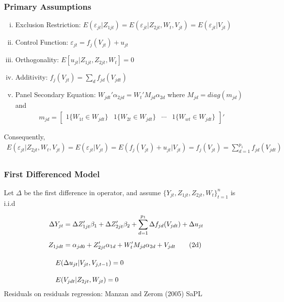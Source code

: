 \documentclass[9pt]{beamer}
\begin{document}
\begin{frame} 
\frametitle{Primary Assumptions} 

	\begin{enumerate}[i.)] \addtolength{\itemsep}{\baselineskip}
	    \item Exclusion Restriction: $E( \varepsilon_{jt}|Z_{1jt}  ) = E( \varepsilon_{jt} | Z_{2jt},W_{t},V_{jt}) = E(\varepsilon_{jt} | V_{jt})$
	    \item Control Function: $\varepsilon_{jt} = f_j(V_{jt}) + u_{jt} $	    \item Orthogonality: $E[u_{jt} |Z_{1jt},Z_{2jt},W_t] = 0$ 
	    \item Additivity: $ f_j(V_{jt}) = \sum_{d} f_{jd}(V_{jdt})$ 
	    \item Panel Secondary Equation: $W_{jdt}'\alpha_{2jd} = W_t'M_{jd}\alpha_{2d}$ where $M_{jd}=diag(m_{jd})$ and
	    \begin{align*} 
	    m_{jd} = \begin{bmatrix} 1\{W_{1t} \in W_{jdt}\} & 1\{W_{2t} \in W_{jdt}\} & \cdots & 1\{W_{wt} \in W_{jdt}\}  \end{bmatrix}'
	    \end{align*}

	\end{enumerate}
\vspace{0.25cm}	
 Consequently,
	\begin{align*} 
	E( \varepsilon_{jt} | Z_{2jt},W_{t},V_{jt}) = E(\varepsilon_{jt} | V_{jt}) =  E(f_j(V_{jt}) + u_{jt} | V_{jt}) = f_j(V_{jt}) = \sum_{d=1}^{p_1} f_{jd}(V_{jdt}) \\
	\end{align*}

\end{frame}
\begin{frame} 
\frametitle{First Differenced Model} 

Let $\Delta$ be the first difference in operator, and assume $\{Y_{jt},Z_{1jt},Z_{2jt},W_{t}\}_{t=1}^n$ is i.i.d 

\begin{align} 
\Delta Y_{jt} &= \Delta Z_{1jt}'\beta_1 + \Delta Z_{2jt}'\beta_2 + \sum_{d=1}^{p_1} \Delta f_{jd}(V_{jdt})  + \Delta u_{jt} \\[5pt]
%
Z_{1jdt} &= \alpha_{jd0} + Z_{2jt}' \alpha_{1d} + W_{t}'M_{jd} \alpha_{2d} + V_{jdt} \tag{2d} \\[10pt]
%
\addtocounter {equation} {1}
E(&\Delta u_{jt}|V_{jt},V_{j,t-1} ) =  0  \\[10pt]
%
E(& V_{jdt} | Z_{2jt},W_{jt}) = 0 
%
\end{align}
\vspace{0.5cm}
Residuals on residuals regression: Manzan and Zerom (2005) SaPL

\end{frame}
\end{document}
